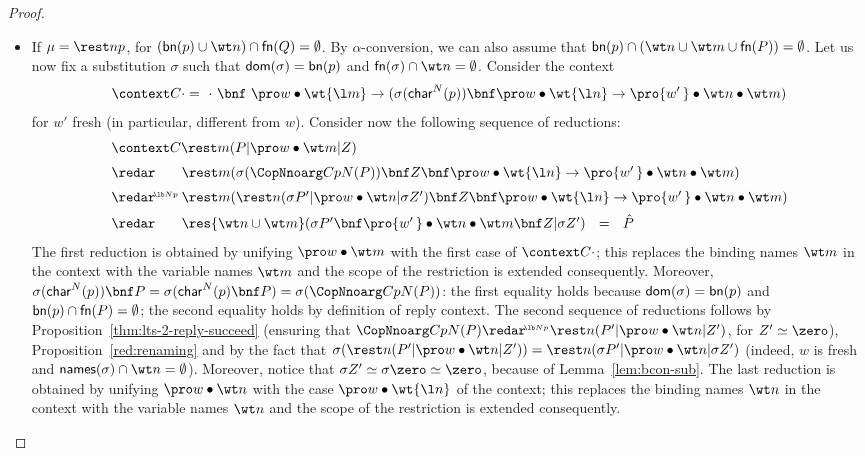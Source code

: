 \documentclass{LMCS}
\renewcommand{\beq}{\simeq}
\newcommand{\withsetnot}[2]{#2}
\begin{document}
\begin{proof}
\begin{itemize}
\item If $\mu = \rest n p$, for $({\sf bn}(p) \cup \wt n) \cap {\sf fn}(Q) = \emptyset$.
By $\alpha$-conversion, we can also assume that ${\sf bn}(p) \cap (\wt n \cup \wt m \cup {\sf fn}(P)) = \emptyset$.
Let us now fix a substitution $\sigma$ such that ${\sf dom}(\sigma) = {\sf bn}(p)$ and
${\sf fn}(\sigma) \cap \wt n=\emptyset$. Consider the context
$$
\context C \cdot =\ \cdot\ \bnf\ \pro w\bullet \wt{\l m} \to(\sigma({\sf char}^{N}(p)) \bnf 
\pro w \bullet \wt{\l n} \to \pro {w'\,} \bullet \wt n \bullet \wt m)
$$
for $w'$ fresh (in particular, different from $w$). Consider now the following sequence of reductions:
$$
\begin{array}{ll}
\multicolumn{2}{l}{\context C {\rest m(P|\pro w\bullet\wt m|Z)}\vspace*{.2cm}}
\\
\vspace*{.2cm}
\redar & 
\rest m(\sigma(\CopNnoarg C p N (P)) \bnf Z \bnf
\pro w \bullet \wt{\l n} \to \pro {w'\,} \bullet \wt n \bullet \wt m)
\\
\vspace*{.2cm}
\redar^{\!_{\lb N p}} \!\!\!\!\! & 
\rest m( \rest n(\sigma P'|\pro w\bullet \wt n|\sigma Z') \bnf Z \bnf
\pro w \bullet \wt{\l n} \to \pro {w'\,} \bullet \wt n \bullet \wt m)
\\
\redar & 
\res{\withsetnot{\wt n, \wt m}{\wt n\cup\wt m}}(\sigma P'\bnf \pro {w'\,} \bullet \wt n \bullet \wt m \bnf Z|\sigma Z')
\ \ = \ \ \hat P
\end{array}
$$
The first reduction is obtained by unifying $\pro w\bullet \wt m$ with the first
case of $\context C \cdot$; this replaces the binding names $\wt m$ in the context with 
the variable names $\wt m$ and the scope of the restriction is extended consequently.
Moreover, $\sigma({\sf char}^{N}(p)) \bnf P = \sigma({\sf char}^{N}(p) \bnf P) = 
\sigma(\CopNnoarg C p N (P))$: the first equality holds because
${\sf dom}(\sigma) = {\sf bn}(p)$ and ${\sf bn}(p) \cap {\sf fn}(P) = \emptyset$;
the second equality holds by definition of reply context.
The second sequence of reductions follows by Proposition~\ref{thm:lts-2-reply-succeed}
(ensuring that $\CopNnoarg C p N (P) \redar^{\!_{\lb N p}} \rest n(P'|\pro w\bullet \wt n|Z')$, for $Z' \beq \zero$), 
Proposition~\ref{red:renaming}
and by the fact that $\sigma(\rest n(P'|\pro w\bullet \wt n|Z')) = \rest n(\sigma P'|\pro w\bullet \wt n|\sigma Z')$
(indeed, $w$ is fresh and ${\sf names}(\sigma) \cap \wt n = \emptyset$).
Moreover, notice that $\sigma Z' \beq \sigma \zero \beq \zero$, because of 
Lemma~\ref{lem:bcon-sub}.
The last reduction is obtained by unifying $\pro w\bullet \wt n$ with the 
case $\pro w\bullet \wt {\l n}$ of the context; this replaces the binding names $\wt n$ 
in the context with the variable names $\wt n$ and the scope of the restriction 
is extended consequently.


\end{itemize}
\end{proof}
\end{document}

